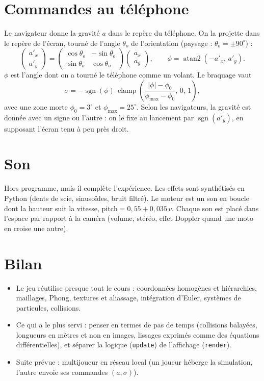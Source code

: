 \documentclass[11pt,a4paper]{article}
\newcommand{\code}[1]{\texttt{#1}}
\begin{document}
\section{Commandes au téléphone}

Le navigateur donne la gravité $a$ dans le repère du téléphone. On la projette dans le repère de l'écran, tourné de l'angle $\theta_o$ de l'orientation (paysage : $\theta_o = \pm 90^\circ$) :
\[
	\begin{pmatrix} a'_x \\ a'_y \end{pmatrix} = \begin{pmatrix} \cos\theta_o & -\sin\theta_o \\ \sin\theta_o & \cos\theta_o \end{pmatrix} \begin{pmatrix} a_x \\ a_y \end{pmatrix},
	\qquad
	\phi = \operatorname{atan2}(-a'_x,\, a'_y).
\]
$\phi$ est l'angle dont on a tourné le téléphone comme un volant. Le braquage vaut
\[
	\sigma = -\operatorname{sgn}(\phi)\,\operatorname{clamp}\!\left(\frac{|\phi| - \phi_0}{\phi_{\max} - \phi_0},\,0,\,1\right),
\]
avec une zone morte $\phi_0 = 3^\circ$ et $\phi_{\max} = 25^\circ$. Selon les navigateurs, la gravité est donnée avec un signe ou l'autre : on le fixe au lancement par $\operatorname{sgn}(a'_y)$, en supposant l'écran tenu à peu près droit.

\section{Son}

Hors programme, mais il complète l'expérience. Les effets sont synthétisés en Python (dents de scie, sinusoïdes, bruit filtré). Le moteur est un son en boucle dont la hauteur suit la vitesse, $\text{pitch} = 0{,}55 + 0{,}035\,v$. Chaque son est placé dans l'espace par rapport à la caméra (volume, stéréo, effet Doppler quand une moto en croise une autre).

\section{Bilan}

\begin{itemize}
	\item Le jeu réutilise presque tout le cours : coordonnées homogènes et hiérarchies, maillages, Phong, textures et aliassage, intégration d'Euler, systèmes de particules, collisions.
	\item Ce qui a le plus servi : penser en termes de pas de temps (collisions balayées, longueurs en mètres et non en images, lissages exprimés comme des équations différentielles), et séparer la logique (\code{update}) de l'affichage (\code{render}).
	\item Suite prévue : multijoueur en réseau local (un joueur héberge la simulation, l'autre envoie ses commandes $(a, \sigma)$).
\end{itemize}
\end{document}
